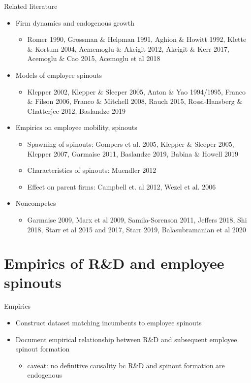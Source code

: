 \documentclass[english,usenames,dvipsnames]{beamer}
\begin{document}
\begin{frame}{Related literature}
\small
\begin{itemize}
\item Firm dynamics and endogenous growth
\begin{itemize}
\footnotesize
\item Romer 1990, Grossman \& Helpman 1991, Aghion \& Howitt 1992, Klette \& Kortum 2004, Acmemoglu \& Akcigit 2012, Akcigit \& Kerr 2017, Acemoglu \& Cao 2015, Acemoglu et al 2018
\end{itemize}
\smallskip
\item Models of employee spinouts
\begin{itemize}
\footnotesize
\item Klepper 2002, Klepper \& Sleeper 2005, Anton \& Yao 1994/1995, Franco \& Filson 2006, Franco \& Mitchell 2008, Rauch 2015, Rossi-Hansberg \& Chatterjee 2012, Baslandze 2019
\end{itemize}
\smallskip
\item Empirics on employee mobility, spinouts
\begin{itemize}
\footnotesize
\item Spawning of spinouts: Gompers et al. 2005, Klepper \& Sleeper 2005, Klepper 2007, Garmaise 2011, Baslandze 2019, Babina \& Howell 2019
\item Characteristics of spinouts: Muendler 2012
\item Effect on parent firms: Campbell et. al 2012, Wezel et al. 2006
\end{itemize}
\smallskip
\item Noncompetes
\begin{itemize}
	\footnotesize
	\item Garmaise 2009, Marx et al 2009, Samila-Sorenson 2011, Jeffers 2018, Shi 2018, Starr et al 2015 and 2017, Starr 2019, Balasubramanian et al 2020
\end{itemize}
\end{itemize}
\end{frame}

\section{Empirics of R\&D and employee spinouts}

\begin{frame}
	\tableofcontents[currentsection]
\end{frame}

\begin{frame}{Empirics}
	\begin{itemize}
		\item Construct dataset matching incumbents to employee spinouts
		\smallskip
		\item Document empirical relationship between R\&D and subsequent employee spinout formation
		\begin{itemize}
			\item caveat: no definitive causality bc R\&D and spinout formation are endogenous 
		\end{itemize}
	\end{itemize}
\end{frame}
\end{document}

